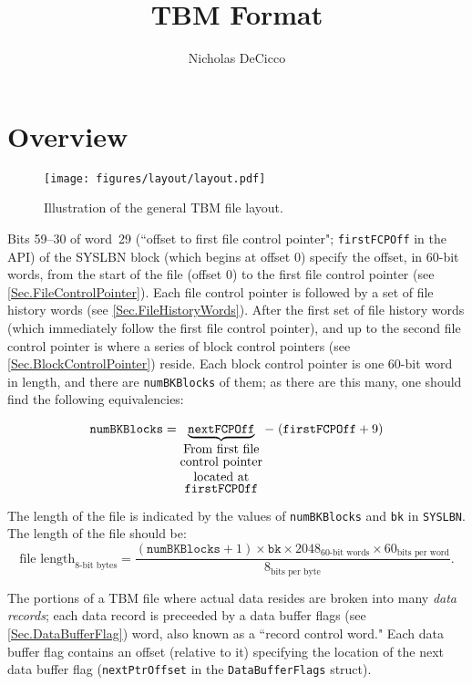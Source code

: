 \documentclass{report}
\begin{document}
\title{TBM Format}
\author{Nicholas DeCicco}
\maketitle

\chapter{Overview}

\begin{figure}
	\centering
	\texttt{[image: figures/layout/layout.pdf]}
	\caption{Illustration of the general TBM file layout.}
	\label{Fig.TBMLayout}
\end{figure}

Bits 59--30 of word~29 (``offset to first file control pointer"; \texttt{firstFCPOff} in the API) of the SYSLBN block (which begins at offset 0) specify the offset, in 60-bit words, from the start of the file (offset 0) to the first file control pointer (see \cref{Sec.FileControlPointer}). Each file control pointer is followed by a set of file history words (see \cref{Sec.FileHistoryWords}). After the first set of file history words (which immediately follow the first file control pointer), and up to the second file control pointer is where a series of block control pointers (see \cref{Sec.BlockControlPointer}) reside. Each block control pointer is one 60-bit word in length, and there are \texttt{numBKBlocks} of them; as there are this many, one should find the following equivalencies:

\begin{align*}
	\mathtt{numBKBlocks} =
	\underbrace{\mathtt{nextFCPOff}}_{\shortstack[c]{
		From first file\\
		control pointer\\
		located at\\
		\texttt{firstFCPOff}
	}} - \; (\mathtt{firstFCPOff} + 9)
\end{align*}

The length of the file is indicated by the values of \texttt{numBKBlocks} and \texttt{bk} in \texttt{SYSLBN}. The length of the file should be:
\[
	\text{file length}_\text{8-bit bytes} = \dfrac{(\texttt{numBKBlocks} + 1) \times \texttt{bk} \times 2048_\text{60-bit words} \times 60_\text{bits per word}}{8_\text{bits per byte}} \mathrm{.}
\]

The portions of a TBM file where actual data resides are broken into many \textit{data records}; each data record is preceeded by a data buffer flags (see \cref{Sec.DataBufferFlag}) word, also known as a ``record control word." Each data buffer flag contains an offset (relative to it) specifying the location of the next data buffer flag (\texttt{nextPtrOffset} in the \texttt{DataBufferFlags} struct).
\end{document}
